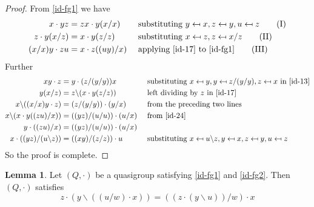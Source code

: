 \documentclass[12pt]{report}
\theoremstyle{definition}
\newtheorem{lem}[thm]{Lemma}
\newcommand{\ldv}{\backslash}       %
\newcommand{\rdv}{/}                %
\begin{document}
\begin{proof}
  From \ref{id-fg1} we have
  \begin{alignat*}{2}
    x\cdot yz &= zx\cdot y(x\rdv x) &&\text{ substituting
      $y\mapsfrom x, z\mapsfrom y, u\mapsfrom z$}\label{id-13} \tag{I}\\
    z\cdot y(x\rdv z) &= x\cdot y(z\rdv z) &&\text{
      substituting $x\mapsfrom z, z\mapsfrom x\rdv z$} \label{id-17} \tag{II}\\
    (x\rdv x)y \cdot zu &= x\cdot z((uy)\rdv x) &&\text{
      applying \ref{id-17} to \ref{id-fg1}} \label{id-24} \tag{III}
  \end{alignat*}
  Further
  \begin{alignat*}{2}
    xy\cdot z &= y\cdot (z\rdv(y\rdv y))x &&\text{ substituting
      $x\mapsfrom y, y\mapsfrom z\rdv(y\rdv y), z\mapsfrom x$ in \ref{id-13}}\\
    y(x\rdv z) &= z\ldv(x\cdot y(z\rdv z)) &&\text{ left dividing by $z$ in \ref{id-17}}\\
    x\ldv((x\rdv x)y\cdot z) &= (z\rdv(y\rdv y))\cdot (y\rdv x)
      &&\text{ from the preceding two lines}\\
    x\ldv(x\cdot y((zu)\rdv x)) &= ((yz)\rdv (u\rdv u))\cdot (u\rdv x)
      &&\text{ from \ref{id-24}}\\
    y\cdot ((zu)\rdv x) &= ((yz)\rdv (u\rdv u))\cdot (u\rdv x) &&\\
    x\cdot ((yz)\rdv (u\ldv z)) &= ((xy)\rdv (z\rdv z))\cdot u &&\text{
      substituting $x\mapsfrom u\ldv z, y\mapsfrom x, z\mapsfrom y, u\mapsfrom z$}
  \end{alignat*}
  So the proof is complete.
\end{proof}

\begin{lem}\label{lem-groupiso}
  Let $(Q,\cdot)$ be a quasigroup satisfying \ref{id-fg1} and \ref{id-fg2}. Then $(Q, \cdot)$ satisfies
  \[z\cdot (y\ldv ((u\rdv w)\cdot x)) = ((z\cdot (y\ldv u))\rdv w)\cdot x\]
\end{lem}
\end{document}
